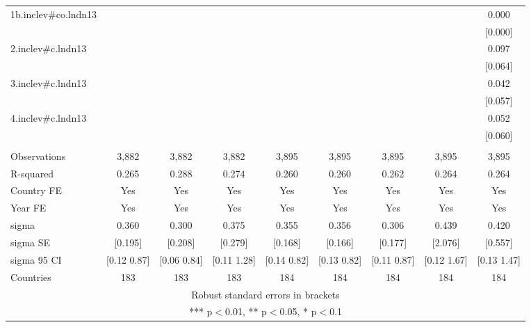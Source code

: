 \begin{tabular}{lcccccccc}
1b.inclev\#co.lndn13 &  &  &  &  &  &  &  & 0.000 \\
 &  &  &  &  &  &  &  & [0.000] \\
2.inclev\#c.lndn13 &  &  &  &  &  &  &  & 0.097 \\
 &  &  &  &  &  &  &  & [0.064] \\
3.inclev\#c.lndn13 &  &  &  &  &  &  &  & 0.042 \\
 &  &  &  &  &  &  &  & [0.057] \\
4.inclev\#c.lndn13 &  &  &  &  &  &  &  & 0.052 \\
 &  &  &  &  &  &  &  & [0.060] \\
 &  &  &  &  &  &  &  &  \\
Observations & 3,882 & 3,882 & 3,882 & 3,895 & 3,895 & 3,895 & 3,895 & 3,895 \\
R-squared & 0.265 & 0.288 & 0.274 & 0.260 & 0.260 & 0.262 & 0.264 & 0.264 \\
Country FE & Yes & Yes & Yes & Yes & Yes & Yes & Yes & Yes \\
Year FE & Yes & Yes & Yes & Yes & Yes & Yes & Yes & Yes \\
sigma & 0.360 & 0.300 & 0.375 & 0.355 & 0.356 & 0.306 & 0.439 & 0.420 \\
sigma SE & [0.195] & [0.208] & [0.279] & [0.168] & [0.166] & [0.177] & [2.076] & [0.557] \\
sigma 95 CI & [0.12 0.87] & [0.06 0.84] & [0.11 1.28] & [0.14 0.82] & [0.13 0.82] & [0.11 0.87] & [0.12 1.67] & [0.13 1.47] \\
 Countries & 183 & 183 & 183 & 184 & 184 & 184 & 184 & 184 \\ \hline
\multicolumn{9}{c}{ Robust standard errors in brackets} \\
\multicolumn{9}{c}{ *** p$<$0.01, ** p$<$0.05, * p$<$0.1} \\
\end{tabular}

